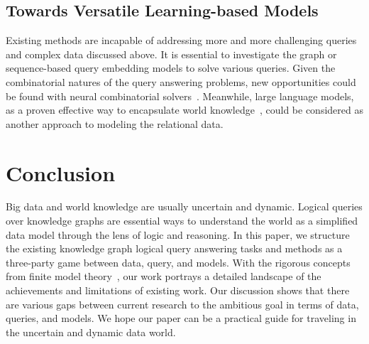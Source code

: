 \documentclass[11pt]{article}
\begin{document}
\subsection{Towards Versatile Learning-based Models}
Existing methods are incapable of addressing more and more challenging queries and complex data discussed above. It is essential to investigate the graph or sequence-based query embedding models to solve various queries. Given the combinatorial natures of the query answering problems, new opportunities could be found with neural combinatorial solvers~\cite{DBLP:conf/iclr/BelloPL0B17}. Meanwhile, large language models, as a proven effective way to encapsulate world knowledge~\cite{petroni2019language,brown2020language}, could be considered as another approach to modeling the relational data.

\section{Conclusion}
Big data and world knowledge are usually uncertain and dynamic. Logical queries over knowledge graphs are essential ways to understand the world as a simplified data model through the lens of logic and reasoning.
In this paper, we structure the existing knowledge graph logical query answering tasks and methods as a three-party game between data, query, and models. With the rigorous concepts from finite model theory~\cite{Marker2002Modeltheory,Libkin2004ElementsFinite}, our work portrays a detailed landscape of the achievements and limitations of existing work. Our discussion shows that there are various gaps between current research to the ambitious goal in terms of data, queries, and models. We hope our paper can be a practical guide for traveling in the uncertain and dynamic data world.

%
%
\end{document}
